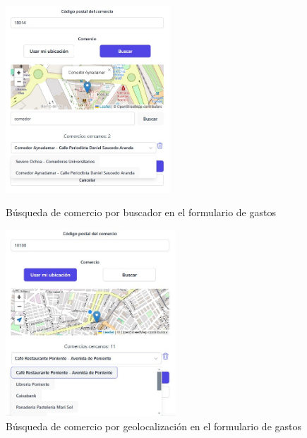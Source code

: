 \begin{figure}[ht!]
    \centering
    \begin{minipage}{0.45\textwidth}
        \centering
        \includegraphics[height = 70mm]{imagenes/mapa_buscador_comercio.jpg}
        \caption{Búsqueda de comercio por buscador en el formulario de gastos}
        \label{fig:mapa_buscador_comercio}
    \end{minipage}\hfill
    \begin{minipage}{0.45\textwidth}
        \centering
        \includegraphics[height = 70mm]{imagenes/mapa_GPS_comercio.jpg}
        \caption{Búsqueda de comercio por geolocalización en el formulario de gastos}
        \label{fig:mapa_GPS_comercio}
    \end{minipage}
\end{figure}

